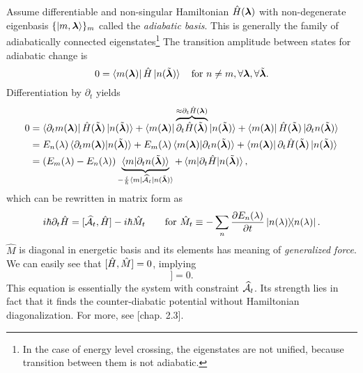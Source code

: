 \section{}

Assume differentiable and non-singular Hamiltonian $\HH(\llambda)$ with non-degenerate eigenbasis $\{\ket{m,\llambda}\}_m$ called the \emph{adiabatic basis}. This is generally the family of adiabatically connected eigenstates\footnote{In the case of energy level crossing, the eigenstates are not unified, because transition between them is not adiabatic.} The transition amplitude between states for adiabatic change is
\begin{equation}
    0=\bra{m(\llambda)}\HH\ket{n(\tilde\llambda)} \quad \text{for }n\neq m, \forall \llambda,\forall \tilde \llambda.
\end{equation}
Differentiation by $\partial_t$ yields
\begin{equation}
    \begin{split}
        0&=\bra{\partial_t m(\llambda)}\HH(\tilde \llambda)\ket{n(\tilde\llambda)}+ \bra{m(\llambda)}\overbrace{\partial_t\HH(\tilde \llambda)}^{\approx \partial_t\HH(\llambda)}\ket{n(\tilde\llambda)}+ \bra{m(\llambda)}\HH(\tilde \llambda)\ket{\partial_t n(\tilde \llambda)}\\
        &=E_n(\lambda)\braket{\partial_t m(\llambda)|n(\tilde \llambda)} + E_m(\lambda)\braket{m(\llambda)|\partial_t n(\tilde \llambda)}+ \bra{m(\llambda)}\partial_t \HH(\tilde\llambda)\ket{n(\tilde \llambda)}\\
        &= (E_m(\lambda)-E_n(\lambda))\underbrace{\braket{m|\partial_t n(\tilde \llambda)}}_{-\frac{i}{\hbar}\bra{m}\AA_t\ket{n(\tilde \llambda)}} + \braket{m|\partial_t\HH|n(\tilde \llambda)},
    \end{split}
\end{equation}
which can be rewritten in matrix form as
\begin{equation}
    i\hbar\partial_t\HH=[\AA_t,\HH]-i\hbar \hat{M}_t\qquad \text{for } \hat{M}_t\equiv -\sum_n\pder{E_n(\lambda)}{t}\ket{n(\lambda)}\!\!\bra{n(\lambda)}.
\end{equation}
$\hat{M}$ is diagonal in energetic basis and its elements has meaning of \emph{generalized force}. We can easily see that $[\HH,\hat{M}]=0$, implying
\begin{equation}
    [\HH,i\hbar\partial_t\HH-[\AA_t,\HH]]=0.
    \label{eq:komutation}
\end{equation}
This equation is essentially the system with constraint $\AA_t$. Its strength lies in fact that it finds the counter-diabatic potential without Hamiltonian diagonalization. For more, see \cite{kolodrubez}[chap. 2.3].






